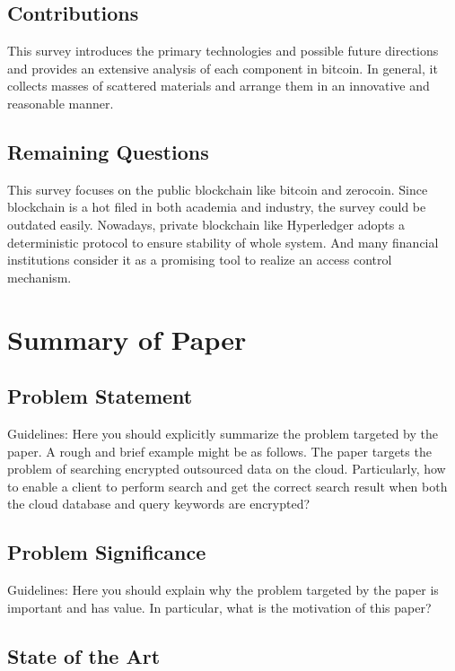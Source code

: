 \documentclass[conference]{IEEEtran}
\begin{document}
\subsection{Contributions}
This survey introduces the primary technologies and possible future directions and provides an extensive analysis of each component in bitcoin. 
%
In general, it collects masses of scattered materials and arrange them in an innovative and reasonable manner. 

\subsection{Remaining Questions}
This survey focuses on the public blockchain like bitcoin and zerocoin. 
%
Since blockchain is a hot filed in both academia and industry, the survey could be outdated easily.
%
Nowadays, private blockchain like Hyperledger\cite{androulaki2018hyperledger} adopts a deterministic protocol to ensure stability of whole system.
%
And many financial institutions consider it as a promising tool to realize an access control mechanism.




\section{Summary of Paper\cite{bonneau2015sok}}

\subsection{Problem Statement}
Guidelines: Here you should explicitly summarize the problem targeted by the paper. A rough and brief example might be as follows.
%
The paper targets the problem of searching encrypted outsourced data on the cloud.
%
Particularly, how to enable a client to perform search and get the correct search result when both the cloud database and query keywords are encrypted?

\subsection{Problem Significance}
Guidelines: Here you should explain why the problem targeted by the paper is important and has value.
%
In particular, what is the motivation of this paper?


\subsection{State of the Art}
\end{document}
